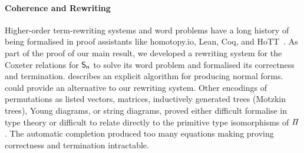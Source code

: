 
\paragraph{Coherence and Rewriting}

Higher-order term-rewriting systems and word problems have a long history of being formalised in proof assistants like
{homotopy.io}, Lean, Coq, and HoTT~\cite{krausCoherenceWellFoundednessTaming2020}. As part of the proof of our main
result, we developed a rewriting system for the Coxeter relations for $\Sn$ to solve its word problem and formalised its
correctness and termination. \citet{Hiver-coq} describes an explicit algorithm for producing normal forms. could provide
an alternative to our rewriting system. Other encodings of permutations as listed vectors, matrices, inductively
generated trees (Motzkin trees), Young diagrams, or string diagrams, proved either difficult formalise in type theory or
difficult to relate directly to the primitive type isomorphisms of $\mathit{\Pi}$. The automatic
\citet{knuthSimpleWordProblems1970} completion produced too many equations making proving correctness and termination
intractable.

